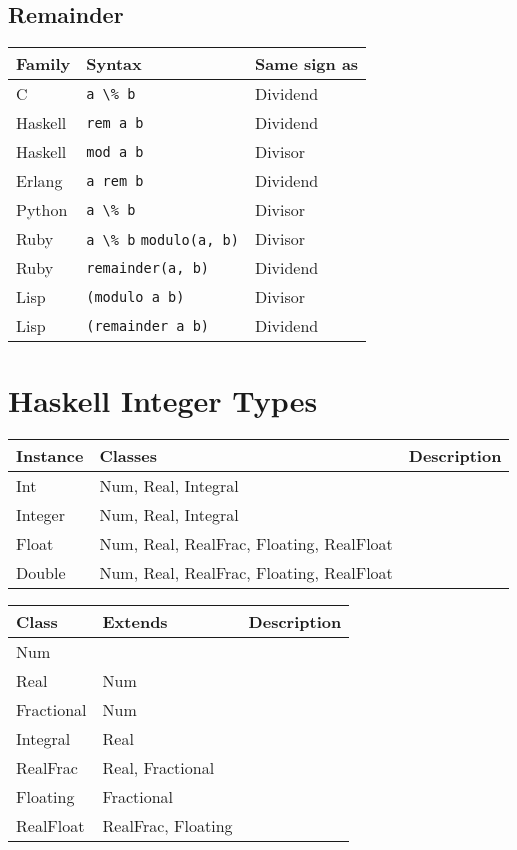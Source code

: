 \documentclass{article}
\begin{document}
\subsection{Remainder}
\begin{longtabu} to 0.75\linewidth { X X X }
	Family & Syntax & Same sign as \\
	\hline
	C & \lstinline$a \% b$ & Dividend \\
	Haskell & \lstinline$rem a b$ & Dividend \\
	Haskell & \lstinline$mod a b$ & Divisor \\
	Erlang & \lstinline$a rem b$ & Dividend \\
	Python & \lstinline$a \% b$ & Divisor \\
	Ruby & \lstinline$a \% b$ \newline \lstinline$modulo(a, b)$ & Divisor \\
	Ruby & \lstinline$remainder(a, b)$ & Dividend \\
	Lisp & \lstinline$(modulo a b)$ & Divisor \\
	Lisp & \lstinline$(remainder a b)$ & Dividend \\

\end{longtabu}

\section{Haskell Integer Types}
\begin{longtabu} to 0.75\linewidth { X X X }
	Instance & Classes & Description \\
	\hline
	Int & Num, Real, Integral & \\
	Integer & Num, Real, Integral & \\
	Float & Num, Real, RealFrac, Floating, RealFloat & \\
	Double & Num, Real, RealFrac, Floating, RealFloat & \\
\end{longtabu}
\begin{longtabu} to 0.75\linewidth { X X X }
	Class & Extends & Description \\
	\hline
	Num & & \\
	Real & Num & \\
	Fractional & Num & \\
	Integral & Real & \\
	RealFrac & Real, Fractional & \\
	Floating & Fractional & \\
	RealFloat & RealFrac, Floating & \\
\end{longtabu}
\end{document}
